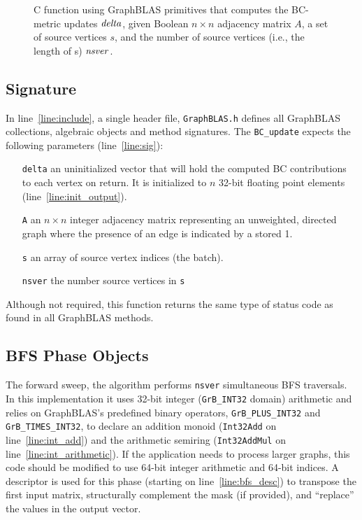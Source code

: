 \begin{figure*}[h]
\caption{C function using GraphBLAS primitives that computes the BC-metric
updates ${\it delta}$, given Boolean $n \times n$ adjacency matrix $A$, a
set of source vertices $s$, and the number of source vertices (i.e., the 
length of s) ${\it nsver}$.}
\label{Fig:BClisting}
{\scriptsize

}
\end{figure*}

\subsection{Signature}

In line~\ref{line:include}, a single header file, {\tt GraphBLAS.h}  
 defines all GraphBLAS collections, algebraic objects and method signatures.  
 The {\tt BC\_update} expects the following parameters (line~\ref{line:sig}):

\begin{itemize} [leftmargin=0.6in]
\item[\tt delta] an uninitialized vector that will hold the computed BC contributions to each
                 vertex on return.  It is initialized to $n$ 32-bit floating
                 point elements (line~\ref{line:init_output}).
\item[\tt A]     an $n\times n$ integer adjacency matrix representing an
                 unweighted, directed graph where the presence of an edge
                 is indicated by a stored 1.
\item[\tt s]     an array of source vertex indices (the batch).
\item[\tt nsver] the number source vertices in {\tt s}
\end{itemize}
\noindent
Although not required, this function returns the same type of status code as
found in all GraphBLAS methods.

\subsection{BFS Phase Objects}
 
The forward sweep, the algorithm performs {\tt nsver} simultaneous BFS traversals.  In this
implementation it uses 32-bit integer ({\tt GrB\_INT32} domain) arithmetic and
relies on GraphBLAS's predefined binary operators, {\tt GrB\_PLUS\_INT32} and 
{\tt GrB\_TIMES\_INT32}, to declare an addition monoid ({\tt Int32Add} on line~\ref{line:int_add})
and the arithmetic semiring ({\tt Int32AddMul} on line~\ref{line:int_arithmetic}). If the application needs to process
 larger graphs, this code should be modified to use 64-bit integer arithmetic and 64-bit indices.
A descriptor is used for this phase (starting on line~\ref{line:bfs_desc})
to transpose the first input matrix, structurally complement the mask (if provided),
and ``replace'' the values in the output vector.

